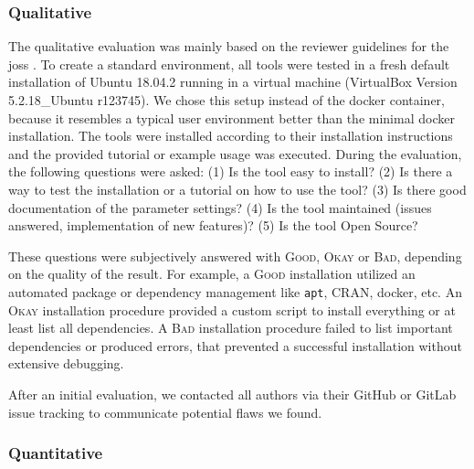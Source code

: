 \documentclass{bmcart}
\newcommand{\ok}{\textsc{Okay}}
\newcommand{\bad}{\textsc{Bad}}
\newcommand{\good}{\textsc{Good}}
\begin{document}
\subsubsection*{Qualitative}
The qualitative evaluation was mainly based on the reviewer guidelines for the \gls{joss} \cite{joss}.
To create a standard environment, all tools were tested in a fresh default installation of Ubuntu 18.04.2 running in a virtual machine (VirtualBox Version 5.2.18\_Ubuntu r123745).
We chose this setup instead of the docker container, because it resembles a typical user environment better than the minimal docker installation.
The tools were installed according to their installation instructions and the provided tutorial or example usage was executed.
During the evaluation, the following questions were asked:
(1) Is the tool easy to install?
(2) Is there a way to test the installation or a tutorial on how to use the tool?
(3) Is there good documentation of the parameter settings? 
(4) Is the tool maintained (issues answered, implementation of new features)?
(5) Is the tool Open Source?

These questions were subjectively answered with \good{}, \ok{} or \bad{}, depending on the quality of the result. 
For example, a \good{} installation utilized an automated package or dependency management like \texttt{apt}, CRAN, docker, etc.
An \ok{} installation procedure provided a custom script to install everything or at least list all dependencies.
A \bad{} installation procedure failed to list important dependencies or produced errors, that prevented a successful installation without extensive debugging.

After an initial evaluation, we contacted all authors via their GitHub or GitLab issue tracking to communicate potential flaws we found.

\subsubsection*{Quantitative}
\end{document}
